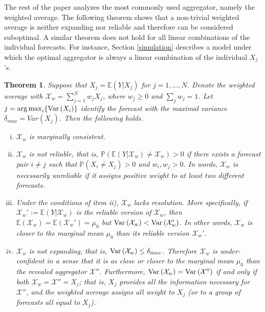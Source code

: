 \documentclass[11pt]{article}
\renewcommand{\P}{\mathbb{P}}
\newcommand{\E}{\mathbb{E}}
\newtheorem{theorem}{Theorem}[section]
\DeclareMathOperator*{\argmax}{arg\,max}
\theoremstyle{definition}
\theoremstyle{definition}
\def\P{{\mathbb P}}
\def\E{{\mathbb E}}
\def\Var{{\rm Var}\,}
\begin{document}
The rest of the paper analyzes the most commonly used aggregator, namely the weighted average. The following theorem shows that a non-trivial weighted average is neither expanding nor reliable and therefore can be considered suboptimal. A similar theorem does not hold for all linear combinations of the individual forecasts. For instance, Section \ref{simulation} describes a model under which the optimal aggregator is always a linear combination of the individual $X_j$'s.




\begin{theorem}\label{contraction}
Suppose that $X_j = \E(Y | X_j)$ for $j = 1, \dots, N$. Denote the weighted average with $\mathcal{X}_w = \sum_{j=1}^N w_jX_j$, where  $w_j \geq 0$ and $\sum_j w_j = 1$.  Let $j = \argmax_i \{ \Var(X_i)  \}$ identify the forecast with the maximal variance $\delta_{max} = Var(X_j)$. Then the following holds.
\begin{enumerate}[i)]
\item  $\mathcal{X}_w$ is marginally consistent.
\item $\mathcal{X}_w$ is not reliable, that is, $\P\left(\E(Y | \mathcal{X}_w) \neq \mathcal{X}_w\right) > 0$ if there exists a forecast pair $i \neq j$ such that $\P(X_i \neq X_j) > 0$ and $w_i, w_j > 0$. In words, $\mathcal{X}_w$ is necessarily unreliable if it assigns positive weight to at least two different forecasts. 
 
 \item Under the conditions of item ii), $\mathcal{X}_w$ lacks resolution. More specifically, if $\mathcal{X}_w' :=  \E(Y| \mathcal{X}_w)$ is the reliable version of $\mathcal{X}_w$, then $\E(\mathcal{X}_w) = \E(\mathcal{X}_w') = \mu_0$ but $\Var(\mathcal{X}_w) < \Var(\mathcal{X}_w')$. In other words, $\mathcal{X}_w$ is closer to the marginal mean $\mu_0$ than its reliable version $\mathcal{X}_w'$. \label{underconfA}
 
\item $\mathcal{X}_w$ is not expanding, that is, $\Var(\mathcal{X}_w) \leq \delta_{max}$. Therefore $\mathcal{X}_w$ is under-confident in a sense that it is as close or closer to the marginal mean $\mu_0$ than the revealed aggregator $\mathcal{X}''$.  Furthermore, $\Var(\mathcal{X}_w) = \Var(\mathcal{X}'')$ if and only if both $\mathcal{X}_w = \mathcal{X}'' = X_j$; that is,  $X_j$ provides all the information necessary for $\mathcal{X}''$, and the weighted average assigns all weight to $X_j$ (or to a group of forecasts all equal to $X_j$). \label{underconfB}
\end{enumerate}
\end{theorem}
\end{document}
